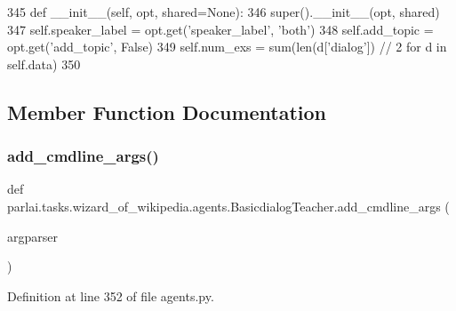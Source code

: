 \begin{DoxyCode}
345     \textcolor{keyword}{def }\_\_init\_\_(self, opt, shared=None):
346         super().\_\_init\_\_(opt, shared)
347         self.speaker\_label = opt.get(\textcolor{stringliteral}{'speaker\_label'}, \textcolor{stringliteral}{'both'})
348         self.add\_topic = opt.get(\textcolor{stringliteral}{'add\_topic'}, \textcolor{keyword}{False})
349         self.num\_exs = sum(len(d[\textcolor{stringliteral}{'dialog'}]) // 2 \textcolor{keywordflow}{for} d \textcolor{keywordflow}{in} self.data)
350 
\end{DoxyCode}


\subsection{Member Function Documentation}
\mbox{\label{classparlai_1_1tasks_1_1wizard__of__wikipedia_1_1agents_1_1BasicdialogTeacher_a05990443efe8ab6f6361cbea39d50dca}} 
\subsubsection{\texorpdfstring{add\+\_\+cmdline\+\_\+args()}{add\_cmdline\_args()}}
{\footnotesize\ttfamily def parlai.\+tasks.\+wizard\+\_\+of\+\_\+wikipedia.\+agents.\+Basicdialog\+Teacher.\+add\+\_\+cmdline\+\_\+args (\begin{DoxyParamCaption}\item[{}]{argparser }\end{DoxyParamCaption})\hspace{0.3cm}{\ttfamily [static]}}



Definition at line 352 of file agents.\+py.


